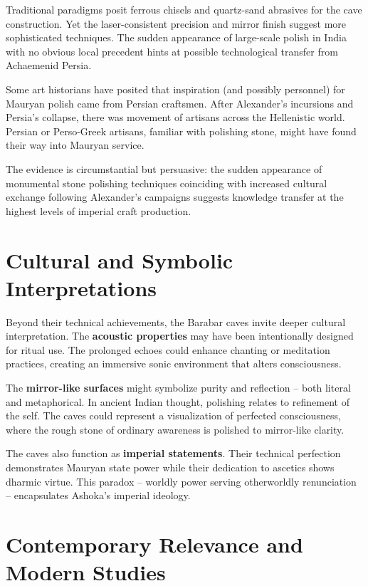 \documentclass[11pt]{article}
\begin{document}
Traditional paradigms posit ferrous chisels and quartz-sand abrasives for the cave construction. Yet the laser-consistent precision and mirror finish suggest more sophisticated techniques. The sudden appearance of large-scale polish in India with no obvious local precedent hints at possible technological transfer from Achaemenid Persia.

Some art historians have posited that inspiration (and possibly personnel) for Mauryan polish came from Persian craftsmen. After Alexander's incursions and Persia's collapse, there was movement of artisans across the Hellenistic world. Persian or Perso-Greek artisans, familiar with polishing stone, might have found their way into Mauryan service.

The evidence is circumstantial but persuasive: the sudden appearance of monumental stone polishing techniques coinciding with increased cultural exchange following Alexander's campaigns suggests knowledge transfer at the highest levels of imperial craft production.

\section{Cultural and Symbolic Interpretations}

Beyond their technical achievements, the Barabar caves invite deeper cultural interpretation. The \textbf{acoustic properties} may have been intentionally designed for ritual use. The prolonged echoes could enhance chanting or meditation practices, creating an immersive sonic environment that alters consciousness.

The \textbf{mirror-like surfaces} might symbolize purity and reflection -- both literal and metaphorical. In ancient Indian thought, polishing relates to refinement of the self. The caves could represent a visualization of perfected consciousness, where the rough stone of ordinary awareness is polished to mirror-like clarity.

The caves also function as \textbf{imperial statements}. Their technical perfection demonstrates Mauryan state power while their dedication to ascetics shows dharmic virtue. This paradox -- worldly power serving otherworldly renunciation -- encapsulates Ashoka's imperial ideology.

\section{Contemporary Relevance and Modern Studies}
\end{document}
